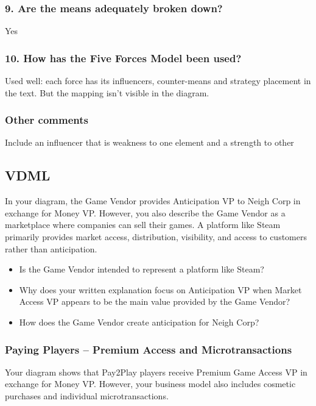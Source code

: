 \documentclass{article}
\begin{document}
\subsubsection*{9. Are the means adequately broken down?}

Yes

\subsubsection*{10. How has the Five Forces Model been used?}

Used well: each force has its influencers, counter-means and strategy placement in the text. But the mapping isn't visible in the diagram.

\subsubsection*{Other comments}

Include an influencer that is weakness to one element and a strength to other

\subsection{VDML}

In your diagram, the Game Vendor provides Anticipation VP to Neigh Corp in exchange for Money VP. However, you also describe the Game Vendor as a marketplace where companies can sell their games. A platform like Steam primarily provides market access, distribution, visibility, and access to customers rather than anticipation.

\begin{itemize}
    \item Is the Game Vendor intended to represent a platform like Steam?
    \item Why does your written explanation focus on Anticipation VP when Market Access VP appears to be the main value provided by the Game Vendor?
    \item How does the Game Vendor create anticipation for Neigh Corp?
\end{itemize}

\subsubsection*{Paying Players -- Premium Access and Microtransactions}

Your diagram shows that Pay2Play players receive Premium Game Access VP in exchange for Money VP. However, your business model also includes cosmetic purchases and individual microtransactions.
\end{document}
